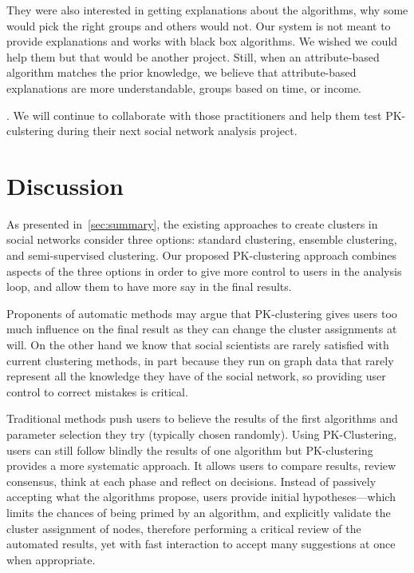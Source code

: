 They were also interested in getting explanations about the algorithms, why some would pick the right groups and others would not. Our system is not meant to provide explanations and works with black box algorithms. We wished we could help them but that would be another project. Still, when an attribute-based algorithm matches the prior knowledge, we believe that attribute-based explanations are more understandable, \eg groups based on time, or income.

.  We will continue to collaborate with those practitioners and help them test PK-culstering during their next social network analysis project.




\section{Discussion}

As presented in~\autoref{sec:summary}, the existing approaches to create clusters in social networks consider three options: standard clustering, ensemble clustering, and semi-supervised clustering. Our proposed PK-clustering approach combines aspects of the three options in order to give more control to users in the analysis loop, and allow them to have more say in the final results.

Proponents of automatic methods may argue that PK-clustering gives users too much influence on the final result as they can change the cluster assignments at will. On the other hand we know that social scientists are rarely satisfied with current clustering methods, in part because they run on graph data that rarely represent all the knowledge they have of the social network, so providing user control to correct mistakes is critical.

Traditional methods push users to believe the results of the first algorithms and parameter selection they try (typically chosen randomly). Using PK-Clustering, users can still follow blindly the results of one algorithm but PK-clustering provides a more systematic approach. It allows users to compare results, review consensus, think at each phase and reflect on decisions. Instead of passively accepting what the algorithms propose, users provide initial hypotheses---which limits the chances of being primed by an algorithm, and explicitly validate the cluster assignment of nodes, therefore performing a critical review of the automated results, yet with fast interaction to accept many suggestions at once when appropriate.

